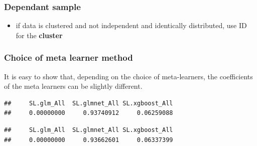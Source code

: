 \documentclass[
]{book}
\newenvironment{Shaded}{\begin{snugshade}}{\end{snugshade}}
\newcommand{\AttributeTok}[1]{\textcolor[rgb]{0.77,0.63,0.00}{#1}}
\newcommand{\FunctionTok}[1]{\textcolor[rgb]{0.00,0.00,0.00}{#1}}
\newcommand{\NormalTok}[1]{#1}
\newcommand{\OtherTok}[1]{\textcolor[rgb]{0.56,0.35,0.01}{#1}}
\newcommand{\SpecialCharTok}[1]{\textcolor[rgb]{0.00,0.00,0.00}{#1}}
\newcommand{\StringTok}[1]{\textcolor[rgb]{0.31,0.60,0.02}{#1}}
\providecommand{\tightlist}{%
  \setlength{\itemsep}{0pt}\setlength{\parskip}{0pt}}
\begin{document}
\hypertarget{dependant-sample}{%
\subsubsection{Dependant sample}\label{dependant-sample}}

\begin{itemize}
\tightlist
\item
  if data is clustered and not independent and identically distributed, use ID for the \textbf{cluster}
\end{itemize}

\hypertarget{choice-of-meta-learner-method}{%
\subsubsection{Choice of meta learner method}\label{choice-of-meta-learner-method}}

It is easy to show that, depending on the choice of meta-learners, the coefficients of the meta learners can be slightly different.

\begin{Shaded}
\end{Shaded}

\begin{verbatim}
##     SL.glm_All  SL.glmnet_All SL.xgboost_All 
##     0.00000000     0.93740912     0.06259088
\end{verbatim}

\begin{Shaded}
\end{Shaded}

\begin{verbatim}
##     SL.glm_All  SL.glmnet_All SL.xgboost_All 
##     0.00000000     0.93662601     0.06337399
\end{verbatim}
\end{document}

